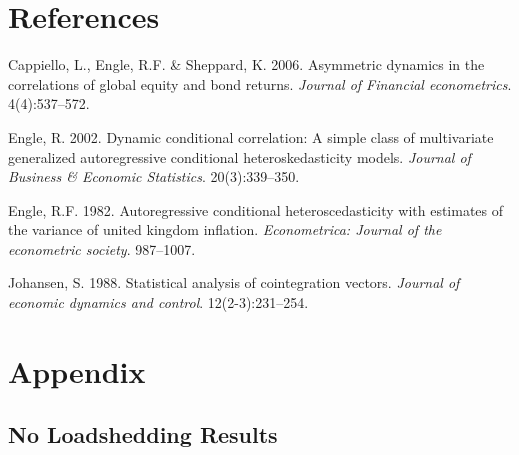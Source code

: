 \documentclass[11pt,preprint, authoryear]{elsarticle}
\numberwithin{equation}{section}
\numberwithin{figure}{section}
\numberwithin{table}{section}
\newlength{\cslhangindent}
\newenvironment{CSLReferences}%
  {\setlength{\parindent}{0pt}%
  \everypar{\setlength{\hangindent}{\cslhangindent}}\ignorespaces}%
  {\par}
\begin{document}
\newpage

\hypertarget{references}{%
\section*{References}\label{references}}

\hypertarget{refs}{}
\begin{CSLReferences}{1}{0}
\leavevmode{}%
Cappiello, L., Engle, R.F. \& Sheppard, K. 2006. Asymmetric dynamics in
the correlations of global equity and bond returns. \emph{Journal of
Financial econometrics}. 4(4):537--572.

\leavevmode{}%
Engle, R. 2002. Dynamic conditional correlation: A simple class of
multivariate generalized autoregressive conditional heteroskedasticity
models. \emph{Journal of Business \& Economic Statistics}.
20(3):339--350.

\leavevmode{}%
Engle, R.F. 1982. Autoregressive conditional heteroscedasticity with
estimates of the variance of united kingdom inflation.
\emph{Econometrica: Journal of the econometric society}. 987--1007.

\leavevmode{}%
Johansen, S. 1988. Statistical analysis of cointegration vectors.
\emph{Journal of economic dynamics and control}. 12(2-3):231--254.

\end{CSLReferences}

\hypertarget{appendix}{%
\section*{Appendix}\label{appendix}}

\hypertarget{no-loadshedding-results}{%
\subsection{No Loadshedding Results}\label{no-loadshedding-results}}
\end{document}
